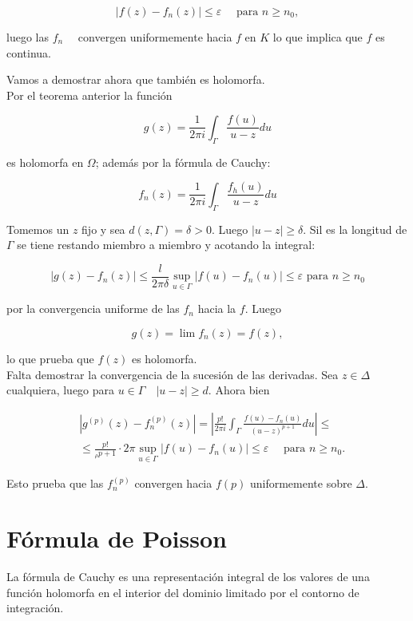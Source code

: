 \documentclass[10pt]{article}
\theoremstyle{plain}
\theoremstyle{definition}
\theoremstyle{remark}
\begin{document}
$$
\left|f(z)-f_{n}(z)\right| \leqslant \varepsilon \quad \text { para } n \geqslant n_0,
$$

luego las $f_{n} \quad$ convergen uniformemente hacia $f$ en $K$ lo que implica que $f$ es continua.

Vamos a demostrar ahora que también es holomorfa.\\
Por el teorema anterior la función

$$
g(z)=\frac{1}{2 \pi i} \int_{\Gamma} \frac{f(u)}{u-z} d u
$$

es holomorfa en $\Omega$; además por la fórmula de Cauchy:

$$
f_{n}(z)=\frac{1}{2 \pi i} \int_{\Gamma} \frac{f_{h}(u)}{u-z} d u
$$

Tomemos un $z$ fijo y sea $d(z, \Gamma)=\delta>0$. Luego $|u-z| \geqslant \delta$. Sil es la longitud de $\Gamma$ se tiene restando miembro a miembro y acotando la integral:

$$
\left|g(z)-f_{n}(z)\right| \leqslant \frac{l}{2 \pi \delta} \sup _{u \in \Gamma}\left|f(u)-f_{n}(u)\right| \leqslant \varepsilon \text { para } n \geqslant n_{0}
$$

por la convergencia uniforme de las $f_{n}$ hacia la $f$. Luego

$$
g(z)=\lim f_{n}(z)=f(z),
$$

lo que prueba que $f(z)$ es holomorfa.\\
Falta demostrar la convergencia de la sucesión de las derivadas. Sea $z \in \Delta$ cualquiera, luego para $u \in \Gamma \quad|u-z| \geqslant d$. Ahora bien

$$
\begin{aligned}
& \left|g^{(p)}(z)-f_{n}^{(p)}(z)\right|=\left|\frac{p!}{2 \pi i} \int_{\Gamma} \frac{f(u)-f_{n}(u)}{(u-z)^{p+1}} d u\right| \leqslant \\
& \leqslant \frac{p!}{{ }_{\rho} p+1} \cdot 2 \pi \sup _{u \in \Gamma}\left|f(u)-f_{n}(u)\right| \leqslant \varepsilon \quad \text { para } n \geqslant n_{0} .
\end{aligned}
$$

Esto prueba que las $f_{n}^{(p)}$ convergen hacia $f(p)$ uniformemente sobre $\Delta$.

\section{Fórmula de Poisson}
La fórmula de Cauchy es una representación integral de los valores de una función holomorfa en el interior del dominio limitado por el contorno de integración.
\end{document}

